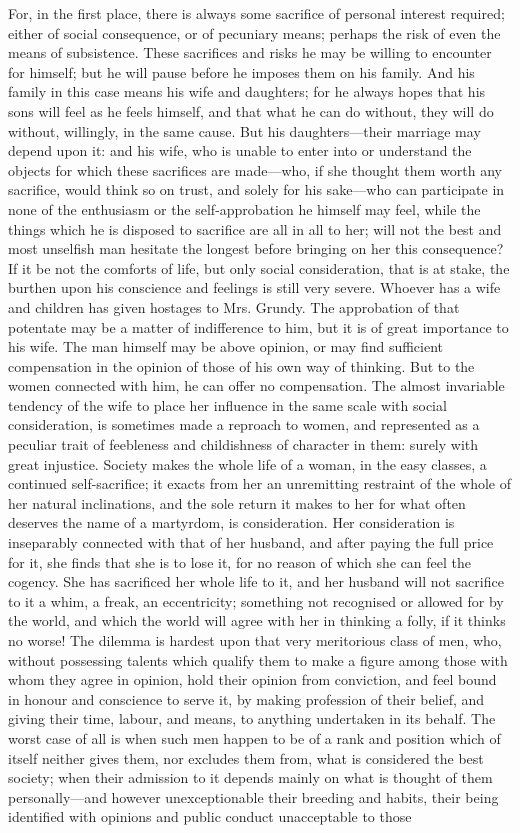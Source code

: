 \documentclass[12pt]{report}
\begin{document}
For, in the first place, there is always some sacrifice of personal interest required; either of social consequence, or of pecuniary means; perhaps the risk of even the means of subsistence. These sacrifices and risks he may be willing to encounter for himself; but he will pause before he imposes them on his family. And his family in this case means his wife and daughters; for he always hopes that his sons will feel as he feels himself, and that what he can do without, they will do without, willingly, in the same cause. But his daughters—their marriage may depend upon it: and his wife, who is unable to enter into or understand the objects for which these sacrifices are made—who, if she thought them worth any sacrifice, would think so on trust, and solely for his sake—who can participate in none of the enthusiasm or the self-approbation he himself may feel, while the things which he is disposed to sacrifice are all in all to her; will not the best and most unselfish man hesitate the longest before bringing on her this consequence? If it be not the comforts of life, but only social consideration, that is at stake, the burthen upon his conscience and feelings is still very severe. Whoever has a wife and children has given hostages to Mrs. Grundy. The approbation of that potentate may be a matter of indifference to him, but it is of great importance to his wife. The man himself may be above opinion, or may find sufficient compensation in the opinion of those of his own way of thinking. But to the women connected with him, he can offer no compensation. The almost invariable tendency of the wife to place her influence in the same scale with social consideration, is sometimes made a reproach to women, and represented as a peculiar trait of feebleness and childishness of character in them: surely with great injustice. Society makes the whole life of a woman, in the easy classes, a continued self-sacrifice; it exacts from her an unremitting restraint of the whole of her natural inclinations, and the sole return it makes to her for what often deserves the name of a martyrdom, is consideration. Her consideration is inseparably connected with that of her husband, and after paying the full price for it, she finds that she is to lose it, for no reason of which she can feel the cogency. She has sacrificed her whole life to it, and her husband will not sacrifice to it a whim, a freak, an eccentricity; something not recognised or allowed for by the world, and which the world will agree with her in thinking a folly, if it thinks no worse! The dilemma is hardest upon that very meritorious class of men, who, without possessing talents which qualify them to make a figure among those with whom they agree in opinion, hold their opinion from conviction, and feel bound in honour and conscience to serve it, by making profession of their belief, and giving their time, labour, and means, to anything undertaken in its behalf. The worst case of all is when such men happen to be of a rank and position which of itself neither gives them, nor excludes them from, what is considered the best society; when their admission to it depends mainly on what is thought of them personally—and however unexceptionable their breeding and habits, their being identified with opinions and public conduct unacceptable to those 
\end{document}
